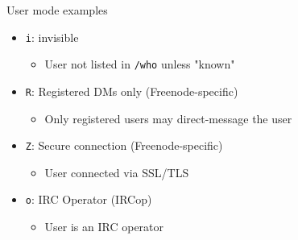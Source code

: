 \documentclass{beamer}
\begin{document}
\begin{frame}{User mode examples}
\begin{itemize}
	\item \texttt{i}: invisible
	\begin{itemize}
		\item User not listed in \texttt{/who} unless "known"
	\end{itemize}
	\item \texttt{R}: Registered DMs only (Freenode-specific)
	\begin{itemize}
		\item Only registered users may direct-message the user
	\end{itemize}
	\item \texttt{Z}: Secure connection (Freenode-specific)
	\begin{itemize}
		\item User connected via SSL/TLS
	\end{itemize}
	\item \texttt{o}: IRC Operator (IRCop)
	\begin{itemize}
		\item User is an IRC operator
	\end{itemize}
\end{itemize}
\end{frame}
\end{document}
